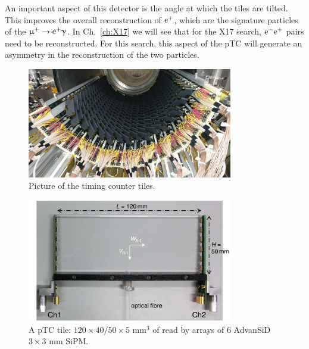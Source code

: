 \begin{refsection}
        \noindent
        An important aspect of this detector is the angle at which the tiles are tilted.
        This improves the overall reconstruction of $\text{e}^+$, which are the signature particles of the $\upmu^+ \rightarrow \text{e}^+ \upgamma$.
        In Ch.~\ref{ch:X17} we will see that for the X17 search, $\text{e}^- \text{e}^+$ pairs need to be reconstructed. 
        For this search, this aspect of the pTC will generate an asymmetry in the reconstruction of the two particles. 

        \begin{figure}
            \centering
            \includegraphics[width = 0.8\textwidth]{Figures/MEG/pTC.png}
            \caption{Picture of the timing counter tiles.}
            \label{fig:MEGII:pTC}
        \end{figure}

        \begin{figure}
            \centering
            \includegraphics[width = 0.8\textwidth]{Figures/MEG/pTC_tile.png}
            \caption{A pTC tile: $120\times40/50\times5$ mm$^3$ of  read by arrays of 6 AdvanSiD $3\times3$ mm SiPM.}
            \label{fig:MEGII:pTC:tile}
        \end{figure}


\end{refsection}
